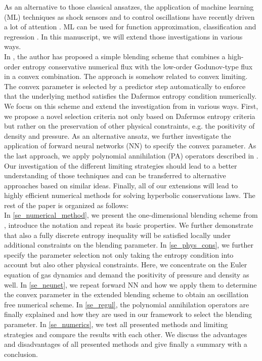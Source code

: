 As an alternative to those classical ansatzes, the application of machine learning (ML) techniques as shock sensors and to control oscillations have recently driven a lot of attention \cite{abgrall2020neural, beck2020neural, discacciati2020controlling, zeifang2021data}.  ML can be used for function approximation, classification and regression  \cite{Cybenko1989}. In this manuscript, we will extend those investigations in various ways. \\
In  \cite{klein2021using}, the author has proposed a simple blending scheme that combines a high-order entropy conservative numerical flux with the low-order Godunov-type flux in a convex combination. The approach is somehow  related to convex limiting. The convex parameter is selected by a
 predictor step automatically to enforce that the underlying method satisfies the Dafermos entropy condition numerically.  We focus on this scheme and extend the investigation from  \cite{klein2021using} in various ways.
 First, we propose a novel selection criteria not only based on Dafermos entropy criteria  \cite{dafermos1973entropy}  but rather on the preservation of other physical constraints, e.g. the positivity of density and pressure. As an alternative ansatz, we  further investigate the application of forward neural networks (NN) to specify the convex  parameter. As the last approach, we apply polynomial annihilation (PA) operators described in \cite{glaubitz2019high}. 
Our investigation of the different limiting strategies should lead to a better understanding of those techniques and can be transferred to 
alternative approaches based on similar ideas. Finally, all of our extensions will lead to highly efficient numerical methods for solving hyperbolic conservations laws.  The rest of the paper is organized as follows:\\
In  \cref{se_numerical_method}, we present the one-dimensional blending scheme from 
\cite{klein2021using}, introduce the notation and repeat its basic properties.  We further demonstrate that also a fully discrete entropy inequality will be satisfied locally under additional constraints on the blending parameter. In \cref{se_phys_cons}, we further specify the parameter selection not only taking the entropy condition into account but also other physical constraints. 
Here, we concentrate on the Euler equation of gas dynamics and demand the positivity of pressure and density as well. In \cref{se_neunet}, we repeat forward NN and how we apply them to determine the convex parameter in the extended blending scheme to obtain an oscillation free numerical scheme. In \cref{se_regul}, the polynomial annihilation  operators are finally 
explained and how they are  used in our framework to select the blending parameter.  In \cref{se_numerics}, we test all presented methods and limiting strategies and compare the results with each other. We discuss the advantages and disadvantages of all presented methods and give finally a summary with a conclusion.  


 

